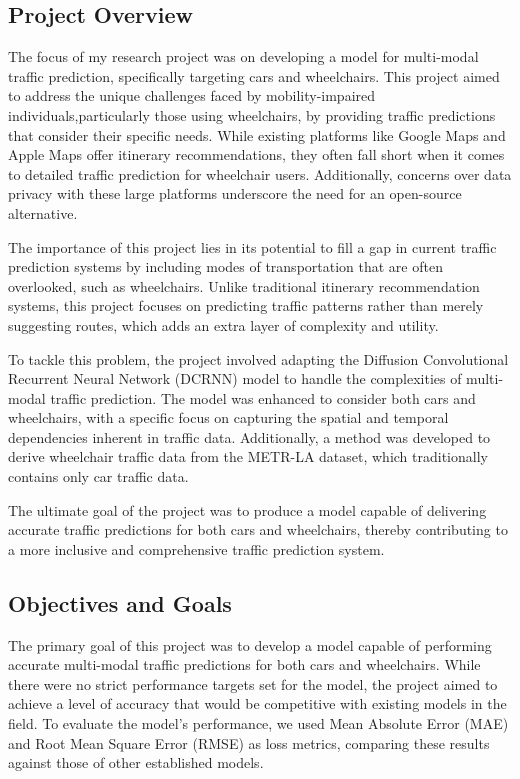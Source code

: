 \subsection{Project Overview}\label{subsec:project-overview}
The focus of my research project was on developing a model for multi-modal traffic prediction, specifically targeting
cars and wheelchairs.
This project aimed to address the unique challenges faced by mobility-impaired individuals,particularly those using
wheelchairs, by providing traffic predictions that consider their specific needs.
While existing platforms like Google Maps and Apple Maps offer itinerary recommendations, they often fall short when it
comes to detailed traffic prediction for wheelchair users.
Additionally, concerns over data privacy with these large platforms underscore the need for an open-source alternative.

The importance of this project lies in its potential to fill a gap in current traffic prediction systems by including
modes of transportation that are often overlooked, such as wheelchairs.
Unlike traditional itinerary recommendation systems, this project focuses on predicting traffic patterns rather than
merely suggesting routes, which adds an extra
layer of complexity and utility.

To tackle this problem, the project involved adapting the Diffusion Convolutional Recurrent Neural Network (DCRNN) model
to handle the complexities of multi-modal traffic prediction.
The model was enhanced to consider both cars and wheelchairs, with a specific focus on capturing the spatial and
temporal dependencies inherent in traffic data.
Additionally, a method was developed to derive wheelchair traffic data from the METR-LA dataset, which traditionally
contains only car traffic data.

The ultimate goal of the project was to produce a model capable of delivering accurate traffic predictions for both cars
and wheelchairs, thereby contributing to a more inclusive and comprehensive traffic prediction system.

\subsection{Objectives and Goals}\label{subsec:objectives-and-goals}
The primary goal of this project was to develop a model capable of performing accurate multi-modal traffic predictions
for both cars and wheelchairs.
While there were no strict performance targets set for the model, the project aimed to achieve a level of accuracy that
would be competitive with existing models in the field.
To evaluate the model's performance, we used Mean Absolute Error (MAE) and Root Mean Square Error (RMSE) as loss
metrics, comparing these results against those of other established models.

